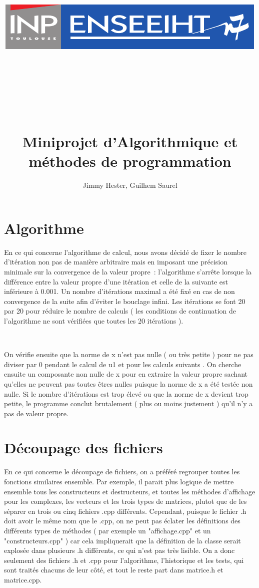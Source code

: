 \documentclass[a4paper]{article}
\title{\includegraphics{images/inp-enseeiht} \\ ~ \\ ~ \\ ~ \\ ~ \\ Miniprojet d'Algorithmique et méthodes de programmation}
\author{Jimmy Hester, Guilhem Saurel}
\date{\oldstylenums{\today}}
\begin{document}
\begin{titlepage}
 \maketitle
\end{titlepage}

\tableofcontents
\newpage

\section{Algorithme}

En ce qui concerne l'algorithme de calcul, nous avons décidé de fixer le nombre d'itération non pas de manière arbitraire mais en imposant une précision minimale sur la convergence de la valeur propre : l'algorithme s’arrête lorsque la différence entre la valeur propre d'une itération et celle de la suivante est inférieure à 0.001. Un nombre d'itérations maximal a été fixé en cas de non convergence de la suite afin d'éviter le bouclage infini. Les itérations se font 20 par 20 pour réduire le nombre de calculs ( les conditions de continuation de l'algorithme ne sont vérifiées que toutes les 20 itérations ).

~

On vérifie ensuite que la norme de x n'est pas nulle ( ou très petite ) pour ne pas diviser par 0 pendant le calcul de u1 et pour les calculs suivants . On cherche ensuite un composante non nulle de x pour en extraire la valeur propre sachant qu'elles ne peuvent pas toutes êtres nulles puisque la norme de x a été testée non nulle. Si le nombre d'itérations est trop élevé ou que la norme de x devient trop petite, le programme conclut brutalement ( plus ou moins justement ) qu'il n'y a pas de valeur propre.

\section{Découpage des fichiers}

En ce qui concerne le découpage de fichiers, on a préféré regrouper toutes les fonctions similaires ensemble. Par exemple, il parait plus logique de mettre ensemble tous les constructeurs et destructeurs, et toutes les méthodes d'affichage pour les complexes, les vecteurs et les trois types de matrices, plutot que de les séparer en trois ou cinq fichiers .cpp différents. Cependant, puisque le fichier .h doit avoir le même nom que le .cpp, on ne peut pas éclater les définitions des différents types de méthodes ( par exemple un "affichage.cpp" et un "constructeurs.cpp" ) car cela impliquerait que la définition de la classe serait explosée dans plusieurs .h différents, ce qui n'est pas très lisible. On a donc seulement des fichiers .h et .cpp pour l'algorithme, l'historique et les tests, qui sont traités chacuns de leur côté, et tout le reste part dans matrice.h et matrice.cpp.
\end{document}
